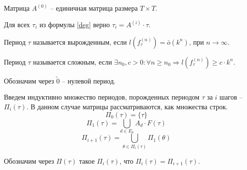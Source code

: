 \documentclass[bibliography=totoc, a4paper, 14pt]{extarticle}
\begin{document}
Матрица $A^{(0)}$ -- единичная матрица размера $T \times T$.

Для всех $\tau_i$ из формулы \eqref{deg} верно $\tau_i = A^{(i)} \cdot \tau$.


Период $\tau$ называется вырожденным, если $l(f_{\tau}^{(n)}) = \bar{o}(k^n)$, при $n\rightarrow\infty$.

Период $\tau$ называется сложным, если
$\exists n_0, c > 0 : \forall n \geqslant n_0 \Rightarrow l(f_{\tau}^{(n)}) \geqslant c \cdot k^n$.

Обозначим через $\tilde{0}$ -- нулевой период.

Введем индуктивно множество периодов, порожденных периодом $\tau$ за $i$ шагов -- $\Pi_i(\tau)$.
В данном случае матрицы рассматриваются, как множества строк.
$$\Pi_0(\tau) = \{\tau\}$$
$$\Pi_1(\tau) = \underset{d \in E_k}{\bigcup} A_d \cdot F(\tau)$$
$$\Pi_{i+1}(\tau) = \underset{\theta \in \Pi_i(\tau)}{\bigcup} \Pi_1(\theta)$$

Обозначим через $\Pi(\tau)$ такое $\Pi_i(\tau)$, что $\Pi_i(\tau) = \Pi_{i+1}(\tau)$.

\end{document}
